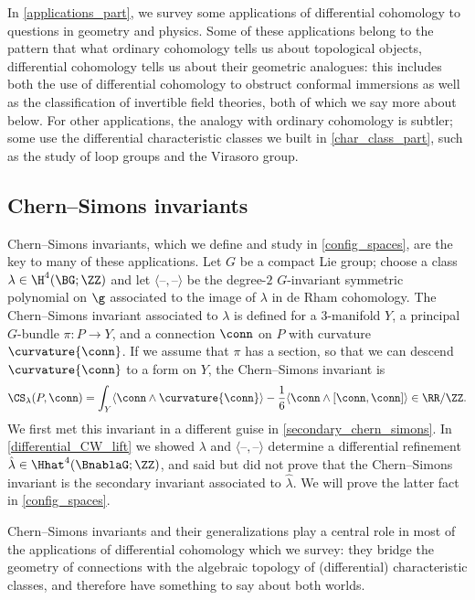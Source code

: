 \label{part:applications}\label{applications_part}

In \cref{applications_part}, we survey some applications of differential cohomology to questions in geometry and
physics. Some of these applications belong to the pattern that what ordinary cohomology tells us about topological
objects, differential cohomology tells us about their geometric analogues: this includes both the use of
differential cohomology to obstruct conformal immersions as well as the classification of invertible field
theories, both of which we say more about below. For other applications, the analogy with ordinary cohomology is
subtler; some use the differential characteristic classes we built in \cref{char_class_part}, such as the study of
loop groups and the Virasoro group.

\subsection*{Chern--Simons invariants}
Chern--Simons invariants, which we define and study in \cref{config_spaces}, are the key to many of these
applications. Let $G$ be a compact Lie group; choose a class $\lambda\in \H^4(\BG;\ZZ)$ and let $\langle\text{--},
\text{--}\rangle$ be the degree-$2$ $G$-invariant symmetric polynomial on $\g$ associated to the image of $\lambda$
in de Rham cohomology. The Chern--Simons invariant associated to $\lambda$ is defined for a $3$-manifold $Y$, a
principal $G$-bundle $\pi\colon P\to Y$, and a connection $\conn$ on $P$ with curvature $\curvature{\conn}$. If we
assume that $\pi$ has a section, so that we can descend $\curvature{\conn}$ to a form on $Y$, the Chern--Simons
invariant is
\begin{equation}
\label{CS_3_intro}
	\CS_\lambda(P, \conn) = \int_Y \langle \conn\wedge\curvature{\conn}\rangle - \frac 16\langle \conn\wedge [\conn,
	\conn]\rangle \in \RR/\ZZ.
\end{equation}
We first met this invariant in a different guise in \cref{secondary_chern_simons}. In \cref{differential_CW_lift}
we showed $\lambda$ and $\langle\text{--}, \text{--}\rangle$ determine a differential refinement
$\hat\lambda\in\Hhat^4(\BnablaG; \ZZ)$, and said but did not prove that the Chern--Simons invariant is the
secondary invariant associated to $\hat\lambda$. We will prove the latter fact in \cref{config_spaces}.

Chern--Simons invariants and their generalizations play a central role in most of the applications of differential
cohomology which we survey: they bridge the geometry of connections with the algebraic topology of (differential)
characteristic classes, and therefore have something to say about both worlds.

